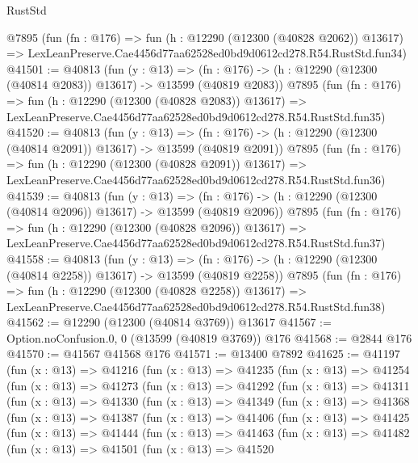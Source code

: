 \begin{lexlean}{RustStd}
\begin{coremodule}
    @7895
    (fun (fn : @176) =>
    fun (h : @12290 (@12300 (@40828 @2062)) @13617) =>
    LexLeanPreserve.Cae4456d77aa62528ed0bd9d0612cd278.R54.RustStd.fun34)
@41501 := @40813
    (fun (y : @13) =>
    (fn : @176) -> (h : @12290 (@12300 (@40814 @2083)) @13617) -> @13599 (@40819 @2083))
    @7895
    (fun (fn : @176) =>
    fun (h : @12290 (@12300 (@40828 @2083)) @13617) =>
    LexLeanPreserve.Cae4456d77aa62528ed0bd9d0612cd278.R54.RustStd.fun35)
@41520 := @40813
    (fun (y : @13) =>
    (fn : @176) -> (h : @12290 (@12300 (@40814 @2091)) @13617) -> @13599 (@40819 @2091))
    @7895
    (fun (fn : @176) =>
    fun (h : @12290 (@12300 (@40828 @2091)) @13617) =>
    LexLeanPreserve.Cae4456d77aa62528ed0bd9d0612cd278.R54.RustStd.fun36)
@41539 := @40813
    (fun (y : @13) =>
    (fn : @176) -> (h : @12290 (@12300 (@40814 @2096)) @13617) -> @13599 (@40819 @2096))
    @7895
    (fun (fn : @176) =>
    fun (h : @12290 (@12300 (@40828 @2096)) @13617) =>
    LexLeanPreserve.Cae4456d77aa62528ed0bd9d0612cd278.R54.RustStd.fun37)
@41558 := @40813
    (fun (y : @13) =>
    (fn : @176) -> (h : @12290 (@12300 (@40814 @2258)) @13617) -> @13599 (@40819 @2258))
    @7895
    (fun (fn : @176) =>
    fun (h : @12290 (@12300 (@40828 @2258)) @13617) =>
    LexLeanPreserve.Cae4456d77aa62528ed0bd9d0612cd278.R54.RustStd.fun38)
@41562 := @12290 (@12300 (@40814 @3769)) @13617
@41567 := Option.noConfusion.{0, 0} (@13599 (@40819 @3769)) @176
@41568 := @2844 @176
@41570 := @41567 @41568 @176
@41571 := @13400 @7892
@41625 := @41197
    (fun (x : @13) =>
    @41216
      (fun (x : @13) =>
      @41235
        (fun (x : @13) =>
        @41254
          (fun (x : @13) =>
          @41273
            (fun (x : @13) =>
            @41292
              (fun (x : @13) =>
              @41311
                (fun (x : @13) =>
                @41330
                  (fun (x : @13) =>
                  @41349
                    (fun (x : @13) =>
                    @41368
                      (fun (x : @13) =>
                      @41387
                        (fun (x : @13) =>
                        @41406
                          (fun (x : @13) =>
                          @41425
                            (fun (x : @13) =>
                            @41444
                              (fun (x : @13) =>
                              @41463
                                (fun (x : @13) =>
                                @41482
                                  (fun (x : @13) =>
                                  @41501
                                    (fun (x : @13) =>
                                    @41520

\end{coremodule}
\end{lexlean}

